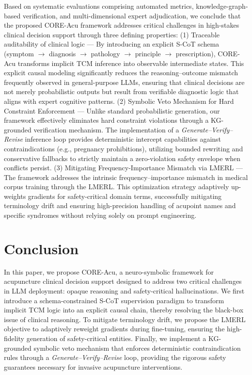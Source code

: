 \documentclass[preprint,5p,times,twocolumn,fleqn]{elsarticle}
\begin{document}
Based on systematic evaluations comprising automated metrics, knowledge-graph-based verification, and multi-dimensional expert adjudication, we conclude that the proposed CORE-Acu framework addresses critical challenges in high-stakes clinical decision support through three defining properties: (1) Traceable auditability of clinical logic — By introducing an explicit S-CoT schema (symptom $\rightarrow$ diagnosis $\rightarrow$ pathology $\rightarrow$ principle $\rightarrow$ prescription), CORE-Acu transforms implicit TCM inference into observable intermediate states. This explicit causal modeling significantly reduces the reasoning--outcome mismatch frequently observed in general-purpose LLMs, ensuring that clinical decisions are not merely probabilistic outputs but result from verifiable diagnostic logic that aligns with expert cognitive patterns. (2) Symbolic Veto Mechanism for Hard Constraint Enforcement — Unlike standard probabilistic generation, our framework effectively eliminates hard constraint violations through a KG-grounded verification mechanism. The implementation of a \textit{Generate--Verify--Revise} inference loop provides deterministic intercept capabilities against contraindications (e.g., pregnancy prohibitions), utilizing bounded rewriting and conservative fallbacks to strictly maintain a zero-violation safety envelope when conflicts persist. (3) Mitigating Frequency-Importance Mismatch via LMERL — The framework addresses the intrinsic frequency--importance mismatch in medical corpus training through the LMERL. This optimization strategy adaptively up-weights gradients for safety-critical domain terms, successfully mitigating terminology drift and ensuring high-precision handling of acupoint names and specific syndromes without relying solely on prompt engineering.


\section{Conclusion}
\label{sec:conclusion}

In this paper, we propose CORE-Acu, a neuro-symbolic framework for acupuncture clinical decision support designed to address two critical challenges in LLM deployment: opaque reasoning and safety-critical hallucinations. We first introduce a schema-constrained S-CoT supervision paradigm to transform implicit TCM logic into an explicit causal chain, thereby resolving the black-box issue of clinical reasoning. To mitigate terminology drift, we propose the LMERL objective to adaptively reweight gradients during fine-tuning, ensuring the high-fidelity generation of safety-critical entities. Finally, we implement a KG-grounded symbolic veto mechanism that enforces deterministic contraindication rules through a \textit{Generate--Verify--Revise} loop, providing the rigorous safety guarantees necessary for invasive acupuncture interventions.
\end{document}
